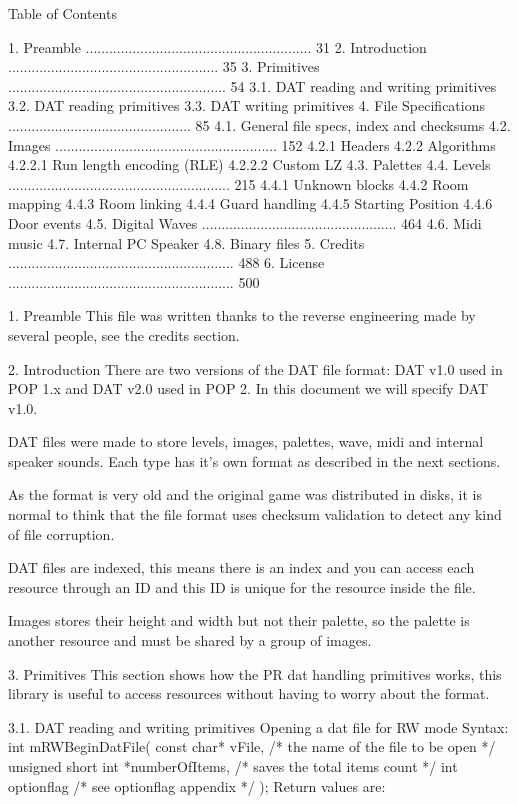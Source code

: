 Table of Contents

1. Preamble .......................................................... 31
2. Introduction ...................................................... 35
3. Primitives ........................................................ 54 
3.1. DAT reading and writing primitives
3.2. DAT reading primitives
3.3. DAT writing primitives
4. File Specifications ............................................... 85 
4.1. General file specs, index and checksums
4.2. Images ......................................................... 152
4.2.1 Headers
4.2.2 Algorithms
4.2.2.1 Run length encoding (RLE)
4.2.2.2 Custom LZ
4.3. Palettes
4.4. Levels ......................................................... 215
4.4.1 Unknown blocks
4.4.2 Room mapping
4.4.3 Room linking
4.4.4 Guard handling
4.4.5 Starting Position
4.4.6 Door events 
4.5. Digital Waves .................................................. 464
4.6. Midi music
4.7. Internal PC Speaker
4.8. Binary files
5. Credits .......................................................... 488
6. License .......................................................... 500

1. Preamble
 This file was written thanks to the reverse engineering made by several
 people, see the credits section.

2. Introduction
 There are two versions of the DAT file format: DAT v1.0 used in POP 1.x
 and DAT v2.0 used in POP 2. In this document we will specify DAT v1.0.

 DAT files were made to store levels, images, palettes, wave, midi and
 internal speaker sounds. Each type has it's own format as described in
 the next sections.
 
 As the format is very old and the original game was distributed in disks,
 it is normal to think that the file format uses checksum validation to
 detect any kind of file corruption.

 DAT files are indexed, this means there is an index and you can access
 each resource through an ID and this ID is unique for the resource inside
 the file.

 Images stores their height and width but not their palette, so the palette
 is another resource and must be shared by a group of images.

3. Primitives
 This section shows how the PR dat handling primitives works, this library
 is useful to access resources without having to worry about the format.

3.1. DAT reading and writing primitives
 Opening a dat file for RW mode
 Syntax:
 int mRWBeginDatFile(
  const char* vFile, /* the name of the file to be open */
  unsigned short int *numberOfItems, /* saves the total items count */
  int optionflag /* see optionflag appendix */
 );
 Return values are:

